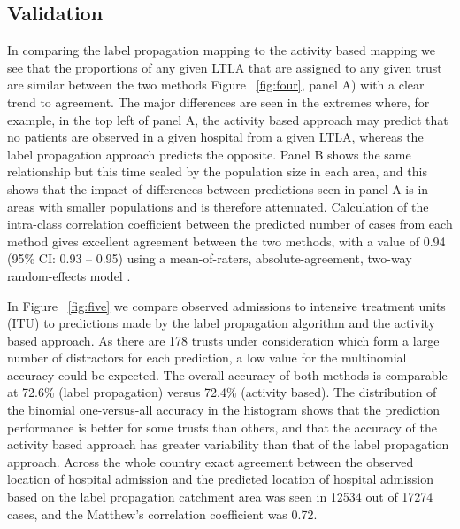 \documentclass[twocolumn]{bmcart}%
\newcommand{\dataInterRater}{0.94 (95\% CI: 0.93 – 0.95)}
\newcommand{\dataNumItus}{178}
\newcommand{\dataOverallAccuracy}{72.6\% (label propagation) versus 72.4\% (activity based)}
\newcommand{\dataCorrect}{12534}
\newcommand{\dataTotal}{17274}
\newcommand{\dataMcc}{0.72}
\begin{document}
\subsection*{Validation}

In comparing the label propagation mapping to the activity based mapping we see that the proportions of any given LTLA 
that are assigned to any given trust are similar between the two methods Figure ~\ref{fig:four}, panel A) with a clear 
trend to agreement. The major differences are seen in the extremes where, for example, in the top left of panel A, the 
activity based approach may predict that no patients are observed in a given hospital from a given LTLA, whereas the 
label propagation approach predicts the opposite. Panel B shows the same relationship but this time scaled by the 
population size in each area, and this shows that the impact of differences between predictions seen in panel A is in 
areas with smaller populations and is therefore attenuated. Calculation of the intra-class correlation coefficient 
between the predicted number of cases from each method gives excellent agreement between the two methods, with a value 
of \dataInterRater{} using a mean-of-raters, absolute-agreement, two-way random-effects 
model \cite{kooGuidelineSelectingReporting2016}.


In Figure ~\ref{fig:five} we compare observed admissions to intensive treatment units (ITU) to predictions made by the 
label propagation algorithm and the activity based approach. As there are \dataNumItus{} trusts under consideration 
which form a large number of distractors for each prediction, a low value for the multinomial accuracy could be 
expected. The overall accuracy of both methods is comparable at \dataOverallAccuracy{}. The distribution of the 
binomial one-versus-all accuracy in the histogram shows that the prediction performance is better for some trusts than 
others, and that the accuracy of the activity based approach has greater variability than that of the label propagation 
approach. Across the whole country exact agreement between the observed location of hospital admission and the predicted 
location of hospital admission based on the label propagation catchment area was seen in \dataCorrect{} out of 
\dataTotal{} cases, and the Matthew's correlation coefficient was \dataMcc{}. 
\end{document}
